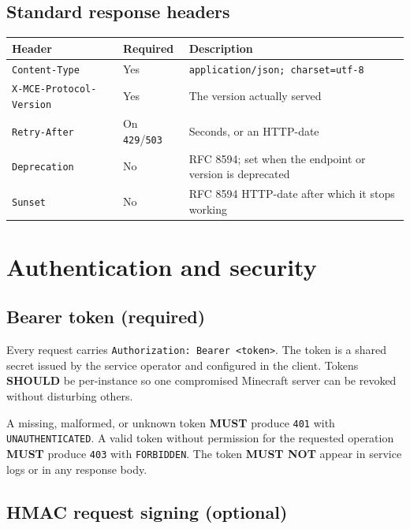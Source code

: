\documentclass[11pt,a4paper]{article}
\newcommand{\code}[1]{\texttt{\small #1}}
\newcommand{\req}{\textbf{MUST}}
\newcommand{\rec}{\textbf{SHOULD}}
\begin{document}
\subsection{Standard response headers}

\begin{tabularx}{\linewidth}{L{5.0cm} L{1.9cm} X}
\toprule
\textbf{Header} & \textbf{Required} & \textbf{Description}\\
\midrule
\code{Content-Type}           & Yes & \code{application/json; charset=utf-8}\\
\code{X-MCE-Protocol-Version} & Yes & The version actually served\\
\code{Retry-After}            & On \code{429}/\code{503} & Seconds, or an HTTP-date\\
\code{Deprecation}            & No  & RFC 8594; set when the endpoint or version is deprecated\\
\code{Sunset}                 & No  & RFC 8594 HTTP-date after which it stops working\\
\bottomrule
\end{tabularx}

\section{Authentication and security}

\subsection{Bearer token (required)}

Every request carries \code{Authorization: Bearer <token>}. The token is a shared secret issued by
the service operator and configured in the client. Tokens \rec{} be per-instance so one compromised
Minecraft server can be revoked without disturbing others.

A missing, malformed, or unknown token \req{} produce \code{401} with \code{UNAUTHENTICATED}. A
valid token without permission for the requested operation \req{} produce \code{403} with
\code{FORBIDDEN}. The token \textbf{MUST NOT} appear in service logs or in any response body.

\subsection{HMAC request signing (optional)}
\label{sec:hmac}
\end{document}
